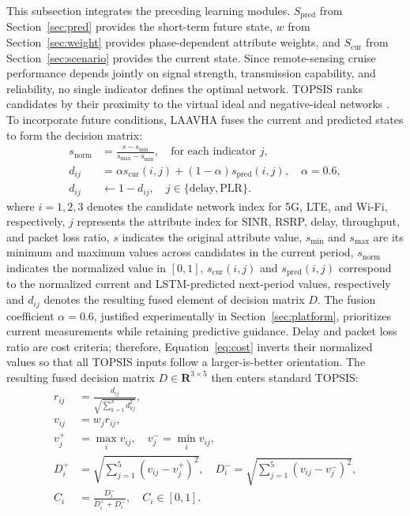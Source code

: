 \documentclass[remotesensing,article,submit,moreauthors]{Definitions/mdpi}
\begin{document}
This subsection integrates the preceding learning modules. $S_{\mathrm{pred}}$ from Section~\ref{sec:pred} provides the short-term future state, $w$ from Section~\ref{sec:weight} provides phase-dependent attribute weights, and $S_{\mathrm{cur}}$ from Section~\ref{sec:scenario} provides the current state. Since remote-sensing cruise performance depends jointly on signal strength, transmission capability, and reliability, no single indicator defines the optimal network. TOPSIS ranks candidates by their proximity to the virtual ideal and negative-ideal networks \citep{ref8,ref9}. To incorporate future conditions, LAAVHA fuses the current and predicted states to form the decision matrix:
\begin{align}
s_{\mathrm{norm}} &= \frac{s-s_{\min}}{s_{\max}-s_{\min}},\quad \text{for each indicator }j, \label{eq:norm}\\
d_{ij} &= \alpha s_{\mathrm{cur}}(i,j)+(1-\alpha)s_{\mathrm{pred}}(i,j),\quad \alpha=0.6, \label{eq:fuse}\\
d_{ij} &\leftarrow 1-d_{ij},\quad j\in\{\mathrm{delay},\mathrm{PLR}\}. \label{eq:cost}
\end{align}
where $i=1,2,3$ denotes the candidate network index for 5G, LTE, and Wi-Fi, respectively, $j$ represents the attribute index for SINR, RSRP, delay, throughput, and packet loss ratio, $s$ indicates the original attribute value, $s_{\min}$ and $s_{\max}$ are its minimum and maximum values across candidates in the current period, $s_{\mathrm{norm}}$ indicates the normalized value in $[0,1]$, $s_{\mathrm{cur}}(i,j)$ and $s_{\mathrm{pred}}(i,j)$ correspond to the normalized current and LSTM-predicted next-period values, respectively and $d_{ij}$ denotes the resulting fused element of decision matrix $D$. The fusion coefficient $\alpha=0.6$, justified experimentally in Section~\ref{sec:platform}, prioritizes current measurements while retaining predictive guidance. Delay and packet loss ratio are cost criteria; therefore, Equation~\eqref{eq:cost} inverts their normalized values so that all TOPSIS inputs follow a larger-is-better orientation. The resulting fused decision matrix $D\in\mathbf{R}^{3\times5}$ then enters standard TOPSIS:
\begin{align}
r_{ij} &= \frac{d_{ij}}{\sqrt{\sum_{k=1}^{3}d_{kj}^{2}}}, \label{eq:topsis1}\\
v_{ij} &= w_j r_{ij}, \label{eq:topsis2}\\
v_j^+ &= \max_i v_{ij},\quad v_j^-=\min_i v_{ij}, \label{eq:topsis3}\\
D_i^+ &= \sqrt{\sum_{j=1}^{5}(v_{ij}-v_j^+)^2},\quad
D_i^-=\sqrt{\sum_{j=1}^{5}(v_{ij}-v_j^-)^2}, \label{eq:topsis4}\\
C_i &= \frac{D_i^-}{D_i^+ + D_i^-},\quad C_i\in[0,1]. \label{eq:topsis5}
\end{align}
\end{document}

